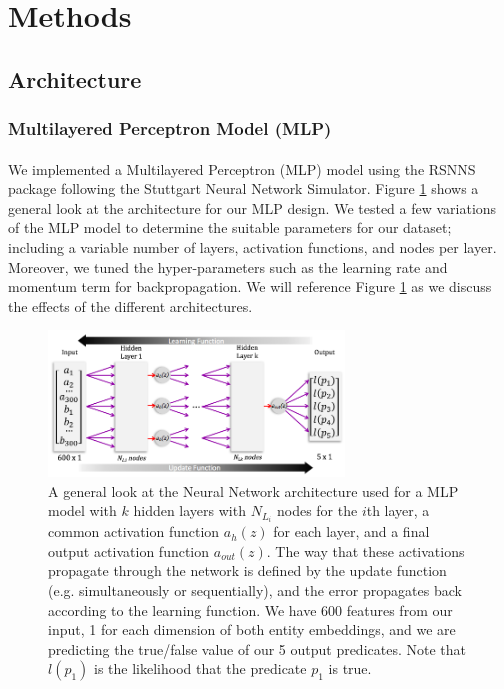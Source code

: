 \documentclass[11.5pt]{article}
\newcounter{Figure}
\newcounter{graphics}
\begin{document}
\section{Methods}
\subsection{Architecture}
\subsubsection{Multilayered Perceptron Model (MLP)}
\paragraph{}We implemented a Multilayered Perceptron (MLP) model using the RSNNS package following the Stuttgart Neural Network Simulator\cite{RSNNS}. Figure \ref{MLPArch} shows a general look at the architecture for our MLP design. We tested a few variations of the MLP model to determine the suitable parameters for our dataset; including a variable number of layers, activation functions, and nodes per layer. Moreover, we tuned the hyper-parameters such as the learning rate and momentum term for backpropagation. We will reference Figure \ref{MLPArch} as we discuss the effects of the different architectures. 


\begin{figure}[h!]
\centerline { \includegraphics[width=0.7\textwidth]{report_mlp/GenArchitecture.png}}
  \caption{\small A general look at the Neural Network architecture used for a MLP model with $k$ hidden layers with $N_{L_i}$ nodes for the $i$th layer, a common activation function $a_h(z)$ for each layer, and a final output activation function $a_{out}(z)$. The way that these activations propagate through the network is defined by the update function (e.g. simultaneously or sequentially), and the error propagates back according to the learning function. We have 600 features from our input, 1 for each dimension of both entity embeddings, and we are predicting the true/false value of our 5 output predicates. Note that $l(p_1)$ is the likelihood that the predicate $p_1$ is true.  }
  \label{MLPArch}
\end{figure}
\end{document}
